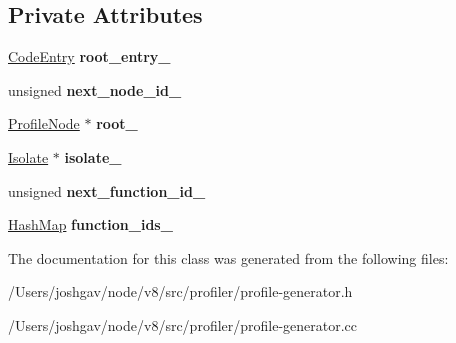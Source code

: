 \subsection*{Private Attributes}
\begin{DoxyCompactItemize}
\item 
\hyperlink{classv8_1_1internal_1_1_code_entry}{Code\+Entry} {\bfseries root\+\_\+entry\+\_\+}\hypertarget{classv8_1_1internal_1_1_profile_tree_a4bf71b54e45df43c6cb91cae95be5239}{}\label{classv8_1_1internal_1_1_profile_tree_a4bf71b54e45df43c6cb91cae95be5239}

\item 
unsigned {\bfseries next\+\_\+node\+\_\+id\+\_\+}\hypertarget{classv8_1_1internal_1_1_profile_tree_a0a40c70ba051d096ae2daa7c4a475169}{}\label{classv8_1_1internal_1_1_profile_tree_a0a40c70ba051d096ae2daa7c4a475169}

\item 
\hyperlink{classv8_1_1internal_1_1_profile_node}{Profile\+Node} $\ast$ {\bfseries root\+\_\+}\hypertarget{classv8_1_1internal_1_1_profile_tree_a8a692d98ebae1f3b6313f9653fbf7b74}{}\label{classv8_1_1internal_1_1_profile_tree_a8a692d98ebae1f3b6313f9653fbf7b74}

\item 
\hyperlink{classv8_1_1internal_1_1_isolate}{Isolate} $\ast$ {\bfseries isolate\+\_\+}\hypertarget{classv8_1_1internal_1_1_profile_tree_aa8b30e7723afe6d700e0e195c0ac83c9}{}\label{classv8_1_1internal_1_1_profile_tree_aa8b30e7723afe6d700e0e195c0ac83c9}

\item 
unsigned {\bfseries next\+\_\+function\+\_\+id\+\_\+}\hypertarget{classv8_1_1internal_1_1_profile_tree_afb46482f9ea2ee745c11606a70a4cf1a}{}\label{classv8_1_1internal_1_1_profile_tree_afb46482f9ea2ee745c11606a70a4cf1a}

\item 
\hyperlink{classv8_1_1internal_1_1_template_hash_map_impl}{Hash\+Map} {\bfseries function\+\_\+ids\+\_\+}\hypertarget{classv8_1_1internal_1_1_profile_tree_a1dbbec8e7ddb19dfadf28f9155c44dda}{}\label{classv8_1_1internal_1_1_profile_tree_a1dbbec8e7ddb19dfadf28f9155c44dda}

\end{DoxyCompactItemize}


The documentation for this class was generated from the following files\+:\begin{DoxyCompactItemize}
\item 
/\+Users/joshgav/node/v8/src/profiler/profile-\/generator.\+h\item 
/\+Users/joshgav/node/v8/src/profiler/profile-\/generator.\+cc\end{DoxyCompactItemize}
